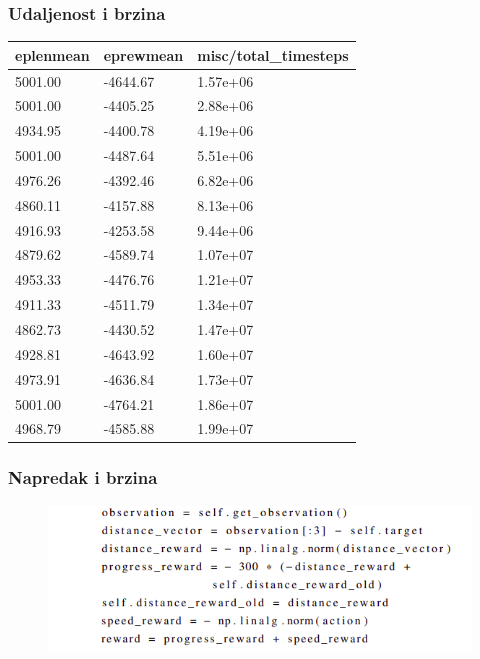 \documentclass{beamer}
\begin{document}
\begin{frame}
	\frametitle{Udaljenost i brzina}

	\begin{table}[ht!]
		\centering
		\label{tab:rub}
		\begin{tabular}{@{}lll@{}}
			\hline
			eplenmean & eprewmean & misc/total\_timesteps \\
			\hline
			\hline
			5001.00   & -4644.67  & 1.57e+06              \\
			5001.00   & -4405.25  & 2.88e+06              \\
			4934.95   & -4400.78  & 4.19e+06              \\
			5001.00   & -4487.64  & 5.51e+06              \\
			4976.26   & -4392.46  & 6.82e+06              \\
			4860.11   & -4157.88  & 8.13e+06              \\
			4916.93   & -4253.58  & 9.44e+06              \\
			4879.62   & -4589.74  & 1.07e+07              \\
			4953.33   & -4476.76  & 1.21e+07              \\
			4911.33   & -4511.79  & 1.34e+07              \\
			4862.73   & -4430.52  & 1.47e+07              \\
			4928.81   & -4643.92  & 1.60e+07              \\
			4973.91   & -4636.84  & 1.73e+07              \\
			5001.00   & -4764.21  & 1.86e+07              \\
			4968.79   & -4585.88  & 1.99e+07              \\
			\hline
		\end{tabular}
	\end{table}

\end{frame}

\begin{frame}
	\frametitle{Napredak i brzina}

	\begin{figure}[h!]
		\centering
		\includegraphics[width=\columnwidth]{img/nb.png}
	\end{figure}

\end{frame}
\end{document}
